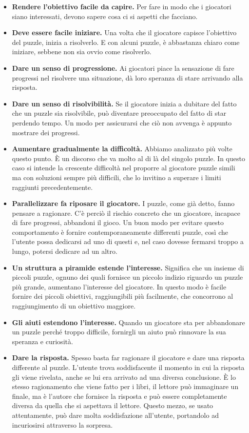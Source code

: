 \begin{itemize}
	\item \textbf{Rendere l’obiettivo facile da capire.} Per fare in modo che i giocatori siano interessati, devono sapere cosa ci si aspetti che facciano.
	\item \textbf{Deve essere facile iniziare.} Una volta che il giocatore capisce l’obiettivo del puzzle, inizia a risolverlo. E con alcuni puzzle, è abbastanza chiaro come iniziare, sebbene non sia ovvio come risolverlo.
	\item \textbf{Dare un senso di progressione.} Ai giocatori piace la sensazione di fare progressi nel risolvere una situazione, dà loro speranza di stare arrivando alla risposta.
	\item \textbf{Dare un senso di risolvibilità.} Se il giocatore inizia a dubitare del fatto che un puzzle sia risolvibile, può diventare preoccupato del fatto di star perdendo tempo. Un modo per assicurarsi che ciò non avvenga è appunto mostrare dei progressi.
	\item \textbf{Aumentare gradualmente la difficoltà.} Abbiamo analizzato più volte questo punto. È un discorso che va molto al di là del singolo puzzle. In questo caso si intende la crescente difficoltà nel proporre al giocatore puzzle simili ma con soluzioni sempre più difficili, che lo invitino a superare i limiti raggiunti precedentemente.
	\item \textbf{Parallelizzare fa riposare il giocatore.} I puzzle, come già detto, fanno pensare a ragionare. C’è perciò il rischio concreto che un giocatore, incapace di fare progressi, abbandoni il gioco. Un buon modo per evitare questo comportamento è fornire contemporaneamente differenti puzzle, così che l’utente possa dedicarsi ad uno di questi e, nel caso dovesse fermarsi troppo a lungo, potersi dedicare ad un altro.
	\item \textbf{Un struttura a piramide estende l’interesse.} Significa che un insieme di piccoli puzzle, ognuno dei quali fornisce un piccolo indizio riguardo un puzzle più grande, aumentano l’interesse del giocatore. In questo modo è facile fornire dei piccoli obiettivi, raggiungibili più facilmente, che concorrono al raggiungimento di un obiettivo maggiore.
	\item \textbf{Gli aiuti estendono l’interesse.} Quando un giocatore sta per abbandonare un puzzle perché troppo difficile, fornirgli un aiuto può rinnovare la sua speranza e curiosità.
	\item \textbf{Dare la risposta.} Spesso basta far ragionare il giocatore e dare una risposta differente al puzzle. L’utente trova soddisfacente il momento in cui la risposta gli viene rivelata, anche se lui era arrivato ad una diversa conclusione. È lo stesso ragionamento che viene fatto per i libri, il lettore può immaginare un finale, ma è l’autore che fornisce la risposta e può essere completamente diversa da quella che si aspettava il lettore. Questo mezzo, se usato attentamente, può dare molta soddisfazione all’utente, portandolo ad incuriosirsi attraverso la sorpresa.

\end{itemize}
